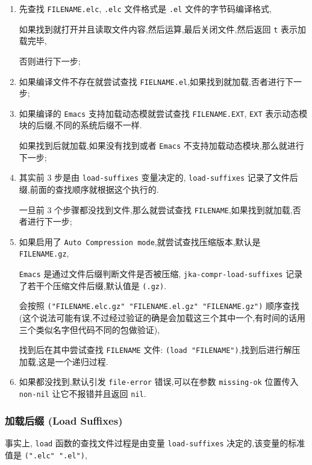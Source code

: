 \documentclass[11pt]{article}
\begin{document}
\begin{enumerate}
\item 先查找 \texttt{FILENAME.elc}, \texttt{.elc} 文件格式是 \texttt{.el} 文件的字节码编译格式,

如果找到就打开并且读取文件内容,然后运算,最后关闭文件,然后返回 \texttt{t} 表示加载完毕,

否则进行下一步;

\item 如果编译文件不存在就尝试查找 \texttt{FIELNAME.el},如果找到就加载,否者进行下一步;

\item 如果编译的 \texttt{Emacs} 支持加载动态模就尝试查找 \texttt{FILENAME.EXT}, \texttt{EXT} 表示动态模块的后缀,不同的系统后缀不一样.

如果找到后就加载,如果没有找到或者 \texttt{Emacs} 不支持加载动态模块,那么就进行下一步;

\item 其实前 3 步是由 \texttt{load-suffixes} 变量决定的, \texttt{load-suffixes} 记录了文件后缀,前面的查找顺序就根据这个执行的.

一旦前 3 个步骤都没找到文件,那么就尝试查找 \texttt{FILENAME},如果找到就加载,否者进行下一步;

\item 如果启用了 \texttt{Auto Compression mode},就尝试查找压缩版本,默认是 \texttt{FILENAME.gz},

\texttt{Emacs} 是通过文件后缀判断文件是否被压缩, \texttt{jka-compr-load-suffixes} 记录了若干个压缩文件后缀,默认值是 \texttt{(.gz)}.

会按照 \texttt{("FILENAME.elc.gz" "FILENAME.el.gz" "FILENAME.gz")} 顺序查找(这个说法可能有误,不过经过验证的确是会加载这三个其中一个,有时间的话用三个类似名字但代码不同的包做验证),

找到后在其中尝试查找 \texttt{FILENAME} 文件: \texttt{(load "FILENAME")},找到后进行解压加载,这是一个递归过程.

\item 如果都没找到,默认引发 \texttt{file-error} 错误,可以在参数 \texttt{missing-ok} 位置传入 \texttt{non-nil} 让它不报错并且返回 \texttt{nil}.
\end{enumerate}


\subsubsection{加载后缀 (Load Suffixes)}
\label{sec:orgb22e8fd}

事实上, \texttt{load} 函数的查找文件过程是由变量 \texttt{load-suffixes} 决定的,该变量的标准值是 \texttt{(".elc" ".el")},
\end{document}
